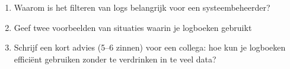\begin{enumerate}
\item Waarom is het filteren van logs belangrijk voor een systeembeheerder?
\item Geef twee voorbeelden van situaties waarin je logboeken gebruikt
\item Schrijf een kort advies (5–6 zinnen) voor een collega: hoe kun je logboeken effici\"ent gebruiken zonder te verdrinken in te veel data?
\end{enumerate}

